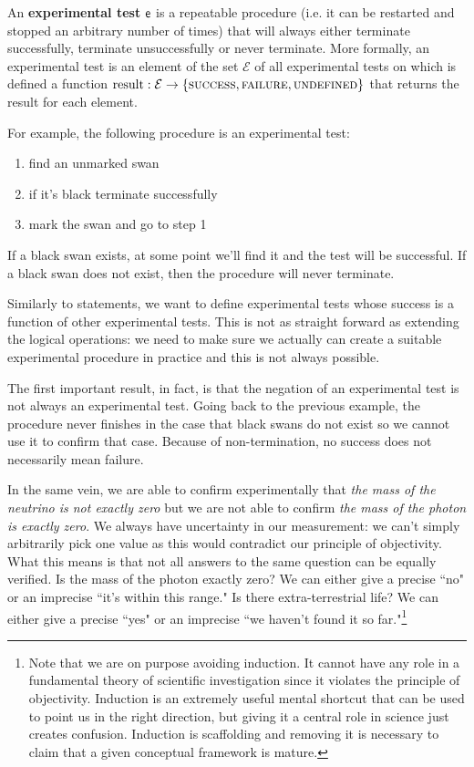 \documentclass[11pt,letterpaper,fleqn]{memoir} %
\begin{document}
\begin{mathSection}
\begin{defn}\label{def_experimental_tests}
	An \textbf{experimental test} $\mathsf{e}$ is a repeatable procedure (i.e. it can be restarted and stopped an arbitrary number of times) that will always either terminate successfully, terminate unsuccessfully or never terminate. More formally, an experimental test is an element of the set $\mathcal{E}$ of all experimental tests on which is defined a function $\operatorname{result}: \mathcal{E} \to \{\textsc{success}, \textsc{failure}, \textsc{undefined}\}$ that returns the result for each element.
\end{defn}
\end{mathSection}

For example, the following procedure is an experimental test:
\begin{enumerate}
	\item find an unmarked swan
	\item if it's black terminate successfully
	\item mark the swan and go to step 1
\end{enumerate}
If a black swan exists, at some point we'll find it and the test will be successful. If a black swan does not exist, then the procedure will never terminate.

Similarly to statements, we want to define experimental tests whose success is a function of other experimental tests. This is not as straight forward as extending the logical operations: we need to make sure we actually can create a suitable experimental procedure in practice and this is not always possible.

The first important result, in fact, is that the negation of an experimental test is not always an experimental test. Going back to the previous example, the procedure never finishes in the case that black swans do not exist so we cannot use it to confirm that case. Because of non-termination, no success does not necessarily mean failure.

In the same vein, we are able to confirm experimentally that \emph{the mass of the neutrino is not exactly zero} but we are not able to confirm \emph{the mass of the photon is exactly zero}. We always have uncertainty in our measurement: we can't simply arbitrarily pick one value as this would contradict our principle of objectivity. What this means is that not all answers to the same question can be equally verified. Is the mass of the photon exactly zero? We can either give a precise ``no" or an imprecise ``it's within this range." Is there extra-terrestrial life? We can either give a precise ``yes" or an imprecise ``we haven't found it so far."\footnote{Note that we are on purpose avoiding induction. It cannot have any role in a fundamental theory of scientific investigation since it violates the principle of objectivity. Induction is an extremely useful mental shortcut that can be used to point us in the right direction, but giving it a central role in science just creates confusion. Induction is scaffolding and removing it is necessary to claim that a given conceptual framework is mature.}
\end{document}

